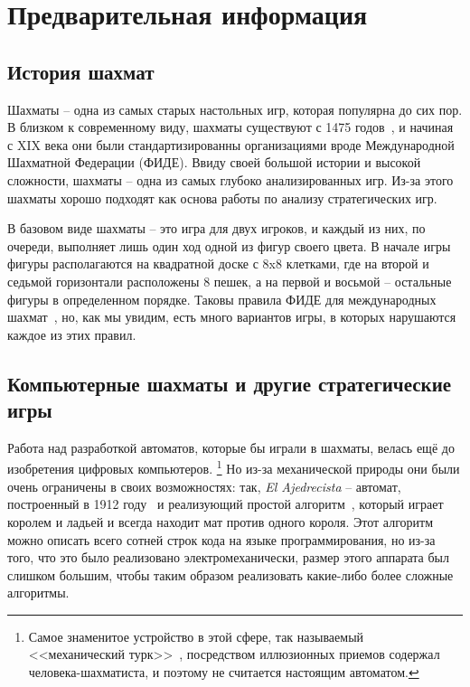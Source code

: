 \documentclass{article}
\begin{document}
\newpage

\tableofcontents

\newpage

\section{Предварительная информация}

\subsection{История шахмат}

Шахматы -- одна из самых старых настольных игр, которая популярна до сих пор.
В близком к современному виду, шахматы существуют с 1475 годов~\cite{world_of_chess},
и начиная с XIX века они были стандартизированны организациями вроде Международной
Шахматной Федерации (ФИДЕ). Ввиду своей большой истории и высокой сложности, шахматы -- 
одна из самых глубоко анализированных игр. Из-за этого шахматы хорошо подходят 
как основа работы по анализу стратегических игр.

В базовом виде шахматы -- это игра для двух игроков,
и каждый из них, по очереди, выполняет лишь один ход одной из фигур своего цвета. 
В начале игры фигуры располагаются на квадратной доске с 8x8 клетками,
где на второй и седьмой горизонтали расположены 8 пешек,
а на первой и восьмой -- остальные фигуры в определенном порядке.
Таковы правила ФИДЕ для международных шахмат~\cite{fide-laws},
но, как мы увидим, есть много вариантов игры,
в которых нарушаются каждое из этих правил.

\subsection{Компьютерные шахматы и другие стратегические игры}

Работа над разработкой автоматов, которые бы играли в шахматы,
велась ещё до изобретения цифровых компьютеров.
\footnote{Самое знаменитое устройство в этой сфере, так называемый <<механический турк>>~\cite{mechturk},
посредством иллюзионных приемов содержал человека-шахматиста,
и поэтому не считается настоящим автоматом.}
Но из-за механической природы они были очень ограничены в своих возможностях:
так, \emph{El Ajedrecista} -- автомат, построенный в 1912 году~\cite{ajedrecista-article}
и реализующий простой алгоритм~\cite{ajedrecista-algo}, который играет королем и ладьей
и всегда находит мат против одного короля.
Этот алгоритм можно описать всего сотней строк кода на языке программирования,
но из-за того, что это было реализовано электромеханически,
размер этого аппарата был слишком большим,
чтобы таким образом реализовать какие-либо более сложные алгоритмы.
\end{document}
